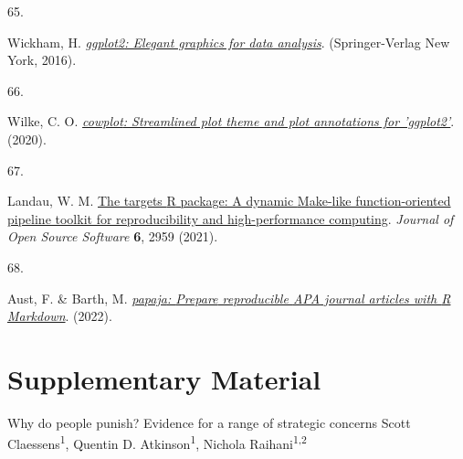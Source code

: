 \documentclass[
  man,floatsintext]{apa6}
\newlength{\cslhangindent}
\newlength{\csllabelwidth}
\newlength{\cslentryspacingunit} %
\newenvironment{CSLReferences}[2] %
 {%
  \setlength{\parindent}{0pt}
  \ifodd #1
  \let\oldpar\par
  \def\par{\hangindent=\cslhangindent\oldpar}
  \fi
  \setlength{\parskip}{#2\cslentryspacingunit}
 }%
 {}
\newcommand{\CSLLeftMargin}[1]{\parbox[t]{\csllabelwidth}{#1}}
\newcommand{\CSLRightInline}[1]{\parbox[t]{\linewidth - \csllabelwidth}{#1}\break}
\begin{document}
\begin{CSLReferences}{0}{0}
\leavevmode{}%
\CSLLeftMargin{65. }%
\CSLRightInline{Wickham, H. \emph{\href{https://ggplot2.tidyverse.org}{{ggplot2}: Elegant graphics for data analysis}}. (Springer-Verlag New York, 2016).}

\leavevmode{}%
\CSLLeftMargin{66. }%
\CSLRightInline{Wilke, C. O. \emph{\href{https://CRAN.R-project.org/package=cowplot}{{cowplot}: Streamlined plot theme and plot annotations for 'ggplot2'}}. (2020).}

\leavevmode{}%
\CSLLeftMargin{67. }%
\CSLRightInline{Landau, W. M. \href{https://doi.org/10.21105/joss.02959}{The targets {R} package: A dynamic {M}ake-like function-oriented pipeline toolkit for reproducibility and high-performance computing}. \emph{Journal of Open Source Software} \textbf{6}, 2959 (2021).}

\leavevmode{}%
\CSLLeftMargin{68. }%
\CSLRightInline{Aust, F. \& Barth, M. \emph{\href{https://github.com/crsh/papaja}{{papaja}: {Prepare} reproducible {APA} journal articles with {R Markdown}}}. (2022).}

\end{CSLReferences}

\endgroup

\newpage
\vspace*{60mm}

\renewcommand{\figurename}{Supplementary Figure}
\renewcommand{\tablename}{Supplementary Table}
\renewcommand{\thefigure}{S\arabic{figure}} \setcounter{figure}{0}
\renewcommand{\thetable}{S\arabic{table}} \setcounter{table}{0}
\renewcommand{\theequation}{S\arabic{equation}} \setcounter{equation}{0}

\hypertarget{supplementary-material}{%
\section{\texorpdfstring{\textbf{Supplementary Material}}{Supplementary Material}}\label{supplementary-material}}

\setcounter{page}{1}
\centering

\noindent \hspace*{10mm} \small Why do people punish? Evidence for a range of strategic concerns \newline
\hspace*{1cm} \small Scott Claessens\textsuperscript{1}, Quentin D. Atkinson\textsuperscript{1}, Nichola Raihani\textsuperscript{1,2} \newline
\end{document}
